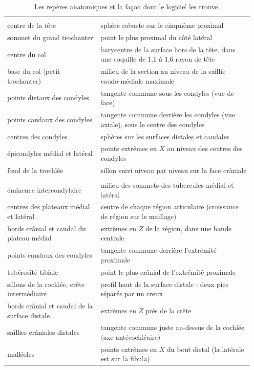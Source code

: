 \begin{table}[htbp]
\centering\small
\caption{Les repères anatomiques et la façon dont le logiciel les trouve.}
\label{tab:reperes}
\begin{tabularx}{\linewidth}{L{4.3cm}Y}
\toprule
{} &  \\
\midrule
{} \\
centre de la tête & sphère robuste sur le cinquième proximal \\
sommet du grand trochanter & point le plus proximal du côté latéral \\
centre du col & barycentre de la surface hors de la tête, dans une coquille de 1,1 à 1,6 rayon de tête \\
base du col (petit trochanter) & milieu de la section au niveau de la saillie caudo-médiale maximale \\
points distaux des condyles & tangente commune sous les condyles (vue de face) \\
points caudaux des condyles & tangente commune derrière les condyles (vue axiale), sous le centre des condyles \\
centres des condyles & sphères sur les surfaces distales et caudales \\
épicondyles médial et latéral & points extrêmes en $X$ au niveau des centres des condyles \\
fond de la trochlée & sillon suivi niveau par niveau sur la face crâniale \\
\midrule
{} \\
éminence intercondylaire & milieu des sommets des tubercules médial et latéral \\
centres des plateaux médial et latéral & centre de chaque région articulaire (croissance de région sur le maillage) \\
bords crânial et caudal du plateau médial & extrêmes en $Z$ de la région, dans une bande centrale \\
points caudaux des condyles & tangente commune derrière l'extrémité proximale \\
tubérosité tibiale & point le plus crânial de l'extrémité proximale \\
sillons de la cochlée, crête intermédiaire & profil haut de la surface distale : deux pics séparés par un creux \\
bords crânial et caudal de la surface distale & extrêmes en $Z$ près de la crête \\
saillies crâniales distales & tangente commune juste au-dessus de la cochlée (axe antécochléaire) \\
malléoles & points extrêmes en $X$ du bout distal (la latérale est sur la fibula) \\
\bottomrule
\end{tabularx}
\end{table}

